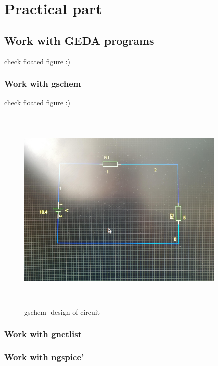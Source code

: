 \documentclass{report}
\begin{document}
 
 \chapter{Practical part}
\section{Work with GEDA programs} 
check floated figure :)
\subsection{Work with gschem}
check floated figure :)

\begin{figure}[!tb]
    \includegraphics[width=10cm,height=10cm,keepaspectratio]{gschem-diagram.jpg}
    \caption{gschem -design of circuit}
\end{figure}

\subsection{ Work with gnetlist}


 
 \subsection{Work with ngspice’}
 
\end{document}
